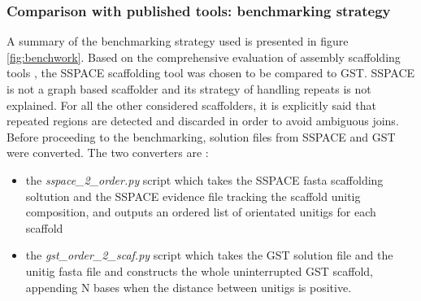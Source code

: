 \documentclass[12pt]{article}
\begin{document}
\subsubsection{Comparison with published tools: benchmarking strategy}
A summary of the benchmarking strategy used is presented in figure \ref{fig:benchwork}. Based on the comprehensive evaluation of assembly scaffolding tools \cite{hunt_comprehensive_2014}, the SSPACE scaffolding tool was chosen to be compared to GST. SSPACE is not a graph based scaffolder and its strategy of handling repeats is not explained. For all the other considered scaffolders, it is explicitly said that repeated regions are detected and discarded in order to avoid ambiguous joins. Before proceeding to the benchmarking, solution files from SSPACE and GST were converted. The two converters are :
\begin{itemize}
\item the \textit{sspace\_2\_order.py} script which takes the SSPACE fasta scaffolding soltution and the SSPACE evidence file tracking the scaffold unitig composition, and outputs an ordered list of orientated unitigs for each scaffold
\item the \textit{gst\_order\_2\_scaf.py} script which takes the GST solution file and the unitig fasta file and constructs the whole uninterrupted GST scaffold, appending N bases when the distance between unitigs is positive.
\end{itemize}
\end{document}

